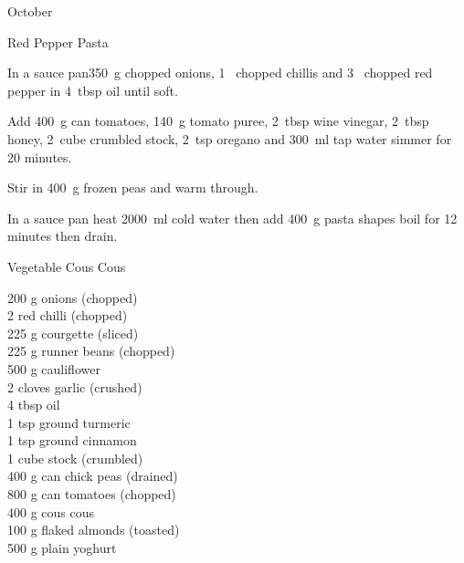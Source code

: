 \begin{menu}{October}
\begin{recipe}{2}{Red Pepper Pasta}
    \begin{instructions}
    \item 
        In a sauce pan350~g chopped onions,
        1~ chopped chillis
        and
        3~ chopped red pepper
        in
        4~tbsp  oil
        until soft.
      \item 
        Add
        400~g  can tomatoes,
        140~g  tomato puree,
        2~tbsp  wine vinegar,
        2~tbsp  honey,
        2~cube crumbled stock,
        2~tsp  oregano
        and
        300~ml  tap water
        simmer for 20 minutes.
      \item 
        Stir in
        400~g  frozen peas
        and warm through.
      \item 
      In a sauce pan heat
      2000~ml  cold water then add
      400~g  pasta shapes
      boil for 12
      minutes then drain.
    
    \end{instructions}
    \end{recipe}%
  
    \begin{recipe}{2}{Vegetable Cous Cous}%
		\begin{ingredients}
		200 g onions (chopped) \\
	2  red chilli (chopped) \\
	225 g courgette (sliced) \\
	225 g runner beans (chopped) \\
	500 g cauliflower  \\
	2 cloves garlic (crushed) \\
	4 tbsp oil  \\
	1 tsp ground turmeric  \\
	1 tsp ground cinnamon  \\
	1 cube stock (crumbled) \\
	400 g can chick peas (drained) \\
	800 g can tomatoes (chopped) \\
	400 g cous cous  \\
	100 g flaked almonds (toasted) \\
	500 g plain yoghurt  \\
	
		\end{ingredients}
	

\end{recipe}
\end{menu}
